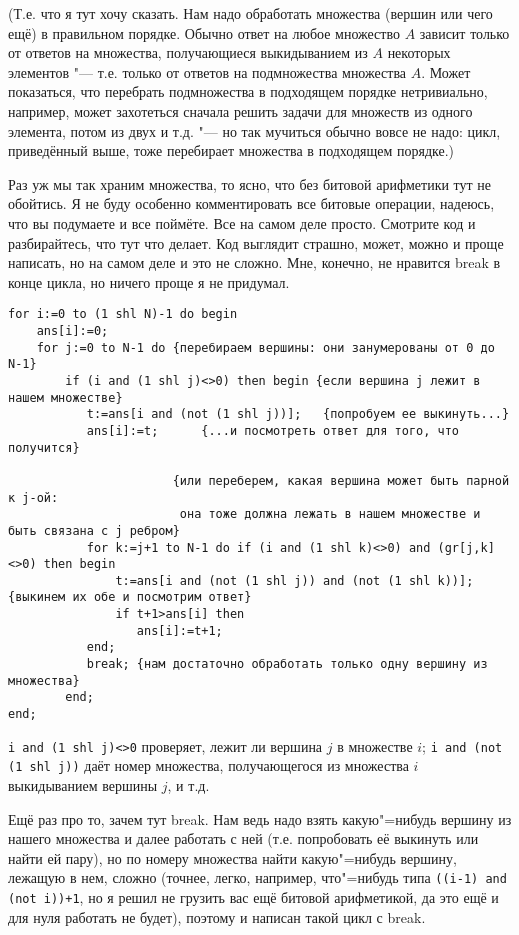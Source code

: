 (Т.е. что я тут хочу сказать. Нам надо обработать множества (вершин или чего ещё) в правильном
порядке. Обычно ответ на любое множество $A$ зависит только от ответов на множества, получающиеся
выкидыванием из $A$ некоторых элементов "--- т.е. только от ответов на подмножества множества $A$.
Может показаться, что перебрать подмножества в подходящем порядке нетривиально, например,
может захотеться сначала решить задачи для множеств из одного элемента, потом из двух и т.д. "--- но
так мучиться обычно вовсе не надо: цикл, приведённый выше, тоже перебирает множества в подходящем
порядке.)

Раз уж мы так храним множества, то ясно, что без битовой арифметики тут не обойтись. Я не буду особенно комментировать
все битовые операции, надеюсь, что вы подумаете и все поймёте. Все на самом деле просто.
Смотрите код и разбирайтесь, что тут что делает. Код выглядит страшно, может, можно и проще написать,
но на самом деле и это не сложно. Мне, конечно, не нравится break в конце цикла, но ничего проще я не придумал.

\begin{codesampleo}\begin{verbatim}
for i:=0 to (1 shl N)-1 do begin
    ans[i]:=0;
    for j:=0 to N-1 do {перебираем вершины: они занумерованы от 0 до N-1}
        if (i and (1 shl j)<>0) then begin {если вершина j лежит в нашем множестве}
           t:=ans[i and (not (1 shl j))];   {попробуем ее выкинуть...}
           ans[i]:=t;      {...и посмотреть ответ для того, что получится}
           
                       {или переберем, какая вершина может быть парной к j-ой: 
                        она тоже должна лежать в нашем множестве и быть связана с j ребром}
           for k:=j+1 to N-1 do if (i and (1 shl k)<>0) and (gr[j,k]<>0) then begin 
               t:=ans[i and (not (1 shl j)) and (not (1 shl k))];   {выкинем их обе и посмотрим ответ}
               if t+1>ans[i] then
                  ans[i]:=t+1;
           end;
           break; {нам достаточно обработать только одну вершину из множества}
        end;
end;
\end{verbatim}
\end{codesampleo}
\verb|i and (1 shl j)<>0| проверяет, лежит ли вершина $j$ в множестве $i$;
\verb|i and (not (1 shl j))| даёт номер множества, получающегося из множества $i$ выкидыванием вершины $j$, и т.д.

Ещё раз про то, зачем тут break. Нам ведь надо взять какую"=нибудь вершину из нашего множества и далее работать с ней
(т.е. попробовать её выкинуть или найти ей пару), но по номеру множества найти какую"=нибудь вершину, лежащую в нем, 
сложно (точнее, легко, например, что"=нибудь типа \texttt{((i-1) and (not i))+1}, но я решил не грузить вас
ещё битовой арифметикой, да это ещё и для нуля работать не будет), поэтому и написан такой цикл с
break.

